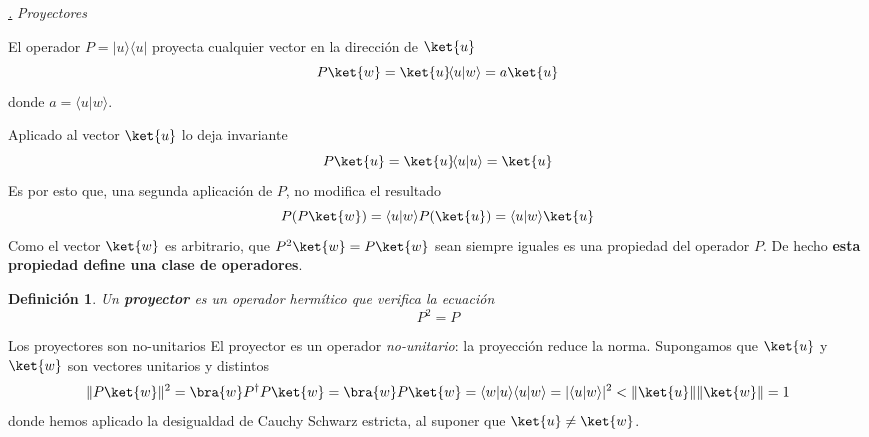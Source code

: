 \documentclass[a4paper,11pt]{book} %
\newtheorem{definicion_contador}{Definición}
\newcommand{\Definicion}[1]{
		\begin{mybox_gray2}{}
			\begin{definicion_contador}
				 #1 
			\end{definicion_contador} 
		\end{mybox_gray2}
	}
\numberwithin{equation}{chapter}
\newcommand{\braket}[2]{\langle #1|#2\rangle}
\newcommand{\ketbra}[2]{| #1\rangle \! \langle #2|}
\def\subsubiContadorIt{\par\addtocounter{subsubsection}{1}\underline{\it\thesubsubsection.}\hskip0.5cm \setcounter{subsubsubsectionIt}{0}}
\newcommand{\SubsubiIt}[1]{
		\subsubiContadorIt \textit{#1}
	}
\newcounter{subsubsubsectionIt}[subsubsection]
\begin{document}
			\SubsubiIt{Proyectores}


	El operador $P = \ketbra{u}{u}$ proyecta cualquier vector en la dirección de $\ket{u}$
	\begin{equation}
	P \ket{w} = \ket{u}\!\braket{u}{w} = a \ket{u}
	\end{equation}
donde $a = \braket{u}{w}$.

Aplicado al vector $\ket{u}$ lo deja invariante
	\begin{equation}
	P \ket{u} = \ket{u}\!\braket{u}{u} =  \ket{u}
	\end{equation}
Es por esto que, una segunda aplicación de $P$, no modifica el resultado
$$
P(P \ket{w}) =  \braket{u}{w} P(\ket{u}) = \braket{u}{w} \ket{u}
$$
Como el vector $\ket{w}$ es arbitrario, que $P^2\ket{w} = P\ket{w}$ sean siempre iguales es una propiedad del operador $P$. De hecho \textbf{esta propiedad define una clase de operadores}. 

	\Definicion{
	Un \textbf{proyector }es un operador hermítico que verifica la ecuación
$$
P^2 = P
$$
	}

\begin{mybox_blue}{Los proyectores son no-unitarios}
El proyector es un operador \textit{no-unitario}: la proyección reduce la norma.
Supongamos que $\ket{u}$ y $\ket{w}$ son vectores unitarios y distintos
	\begin{equation}
	\| P\ket{w}\|^2 = \bra{w}P^\dagger P\ket{w} = \bra{w} P\ket{w}= \braket{w}{u}\braket{u}{w} = |\braket{u}{w}|^2 < \|\ket{u}\|\|\ket{w}\| = 1  
	\end{equation}
donde hemos aplicado la desigualdad de Cauchy Schwarz estricta, al suponer que $\ket{u}\neq\ket{w}$.
\end{mybox_blue}
\end{document}
